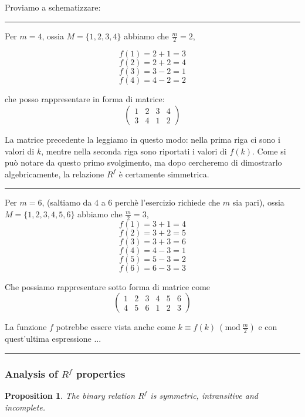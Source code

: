 \documentclass{article}
\newtheorem{prop}{Proposition}
\begin{document}
Proviamo a schematizzare:

\medskip


\noindent
{\color{blue} \rule{\linewidth}{0.5mm} }

Per $m=4$, ossia $M = \{1, 2, 3, 4\}$ abbiamo che $\frac{m}{2} = 2$, 

\[f(1)= 2 + 1 = 3\] 
\[f(2)= 2 + 2 = 4\] 
\[f(3)= 3 - 2 = 1\] 
\[f(4)= 4 - 2 = 2\] 


che posso rappresentare in forma di matrice:
\[
\begin{pmatrix}
 1 & 2 & 3 & 4 \\
 3 & 4 & 1 & 2
\end{pmatrix}
\]

La matrice precedente la leggiamo in questo modo: nella prima riga ci sono i valori di $k$, mentre nella seconda riga sono riportati i valori di $f(k)$. Come si pu\`o notare da questo primo svolgimento, ma dopo cercheremo di dimostrarlo algebricamente, la relazione $R^f$ \`e certamente simmetrica.

\noindent
{\color{blue} \rule{\linewidth}{0.5mm} }

Per $m=6$, (saltiamo da $4$ a $6$ perch\`e l'esercizio richiede che $m$ sia pari), ossia $M = \{1, 2, 3, 4, 5, 6\}$ abbiamo che $\frac{m}{2} = 3$, \\

\[f(1)=3+1=4\] 
\[f(2)=3+2=5\] 
\[f(3)=3+3=6\] 
\[f(4)=4-3=1\] 
\[f(5)=5-3=2\] 
\[f(6)=6-3=3\] 

Che possiamo rappresentare sotto forma di matrice come
\[
\begin{pmatrix}
 1 & 2 & 3 & 4 & 5 & 6 \\
 4 & 5 & 6 & 1 & 2 & 3 
\end{pmatrix}
\]

La funzione $f$ potrebbe essere vista anche come $k \equiv f(k)\ (\textrm{mod}\ \frac{m}{2})$ e con quest'ultima espressione ...

\noindent
{\color{blue} \rule{\linewidth}{0.5mm} }
\subsubsection{Analysis of $R^f$ properties}

\begin{prop}
 The binary relation $R^f$ is symmetric, intransitive and incomplete.
\end{prop}
\end{document}
